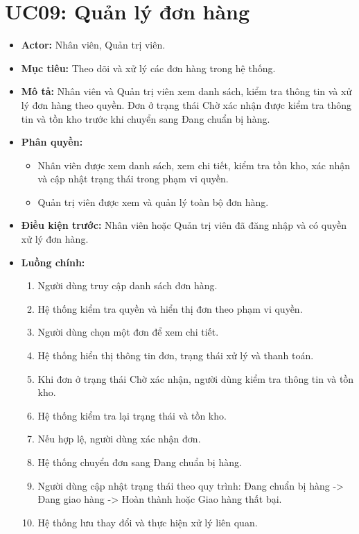 \section{UC09: Quản lý đơn hàng}
\begin{itemize}
    \item \textbf{Actor:} Nhân viên, Quản trị viên.
    \item \textbf{Mục tiêu:} Theo dõi và xử lý các đơn hàng trong hệ thống.
    \item \textbf{Mô tả:} Nhân viên và Quản trị viên xem danh sách, kiểm tra thông tin và xử lý đơn hàng theo quyền. Đơn ở trạng thái Chờ xác nhận được kiểm tra thông tin và tồn kho trước khi chuyển sang Đang chuẩn bị hàng.
    \item \textbf{Phân quyền:}
    \begin{itemize}
        \item Nhân viên được xem danh sách, xem chi tiết, kiểm tra tồn kho, xác nhận và cập nhật trạng thái trong phạm vi quyền.
        \item Quản trị viên được xem và quản lý toàn bộ đơn hàng.
    \end{itemize}
    \item \textbf{Điều kiện trước:} Nhân viên hoặc Quản trị viên đã đăng nhập và có quyền xử lý đơn hàng.
    \item \textbf{Luồng chính:}
    \begin{enumerate}
        \item Người dùng truy cập danh sách đơn hàng.
        \item Hệ thống kiểm tra quyền và hiển thị đơn theo phạm vi quyền.
        \item Người dùng chọn một đơn để xem chi tiết.
        \item Hệ thống hiển thị thông tin đơn, trạng thái xử lý và thanh toán.
        \item Khi đơn ở trạng thái Chờ xác nhận, người dùng kiểm tra thông tin và tồn kho.
        \item Hệ thống kiểm tra lại trạng thái và tồn kho.
        \item Nếu hợp lệ, người dùng xác nhận đơn.
        \item Hệ thống chuyển đơn sang Đang chuẩn bị hàng.
        \item Người dùng cập nhật trạng thái theo quy trình: Đang chuẩn bị hàng -> Đang giao hàng -> Hoàn thành hoặc Giao hàng thất bại.
        \item Hệ thống lưu thay đổi và thực hiện xử lý liên quan.
    \end{enumerate}

\end{itemize}
